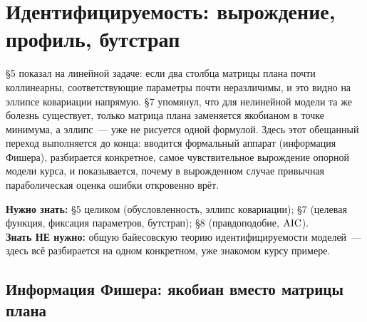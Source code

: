 %
%
\section{Идентифицируемость: вырождение, профиль, бутстрап}
\label{sec:identifiability}

§5 показал на линейной задаче: если два столбца матрицы плана почти коллинеарны, соответствующие
параметры почти неразличимы, и это видно на эллипсе ковариации напрямую. §7 упомянул, что для
нелинейной модели та же болезнь существует, только матрица плана заменяется якобианом в точке
минимума, а эллипс~--- уже не рисуется одной формулой. Здесь этот обещанный переход выполняется до
конца: вводится формальный аппарат (информация Фишера), разбирается конкретное, самое
чувствительное вырождение опорной модели курса, и показывается, почему в вырожденном случае
привычная параболическая оценка ошибки откровенно врёт.

\begin{tcolorbox}[enhanced,colback=cPanel,colframe=cGrid,boxrule=0.8pt,arc=2pt,
                  title={\bfseries\color{cAccent} Пререквизиты},coltitle=cAccent,
                  attach boxed title to top left={xshift=6pt,yshift=-2pt},
                  boxed title style={colback=cPanel,boxrule=0pt,arc=0pt},top=10pt]
\textbf{Нужно знать:} §5 целиком (обусловленность, эллипс ковариации); §7 (целевая функция,
фиксация параметров, бутстрап); §8 (правдоподобие, $\operatorname{AIC}$).\\[0.3em]
\textbf{Знать НЕ нужно:} общую байесовскую теорию идентифицируемости моделей~--- здесь всё
разбирается на одном конкретном, уже знакомом курсу примере.
\end{tcolorbox}

\subsection{Информация Фишера: якобиан вместо матрицы плана}
\label{subsec:fisher}

